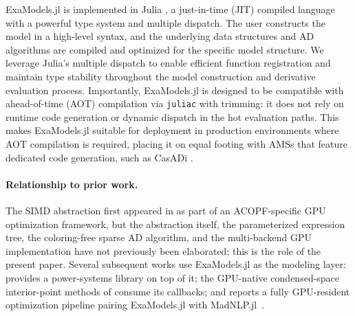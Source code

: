 \documentclass[11pt]{article}
\begin{document}
ExaModels.jl is implemented in Julia \citep{bezansonJuliaFreshApproach2017}, a just-in-time (JIT) compiled language with a powerful type system and multiple dispatch. The user constructs the model in a high-level syntax, and the underlying data structures and AD algorithms are compiled and optimized for the specific model structure. We leverage Julia's multiple dispatch to enable efficient function registration and maintain type stability throughout the model construction and derivative evaluation process. Importantly, ExaModels.jl is designed to be compatible with ahead-of-time (AOT) compilation via \texttt{juliac} with trimming: it does not rely on runtime code generation or dynamic dispatch in the hot evaluation paths. This makes ExaModels.jl suitable for deployment in production environments where AOT compilation is required, placing it on equal footing with AMSs that feature dedicated code generation, such as CasADi \citep{anderssonCasADiSoftwareFramework2019}.

\paragraph{Relationship to prior work.}
The SIMD abstraction first appeared in \citet{shinAcceleratingOptimalPower2024} as part of an ACOPF-specific GPU optimization framework, but the abstraction itself, the parameterized expression tree, the coloring-free sparse AD algorithm, and the multi-backend GPU implementation have not previously been elaborated; this is the role of the present paper. Several subsequent works use ExaModels.jl as the modeling layer: \citet{shinExaModelsPowerjl2024} provides a power-systems library on top of it; the GPU-native condensed-space interior-point methods of \citet{pacaudCondensedspaceMethodsNonlinear2024} consume its callbacks; and \citet{pacaudGPUacceleratedNonlinearModel2024} reports a fully GPU-resident optimization pipeline pairing ExaModels.jl with MadNLP.jl~\citep{shinMadNLPjl2025}.
\end{document}
